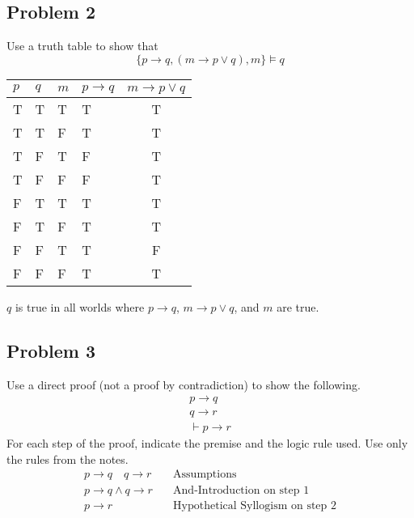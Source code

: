 \documentclass{math}
\begin{document}
\subsection*{Problem 2}
Use a truth table to show that
\[ \{p\to q,(m\to p\vee q),m\}\models q \]
\begin{center}
  \begin{tabular}{|p{0.6cm}|p{0.6cm}|p{0.6cm}|p{0.6cm}|c|}
    \hline
    \( p \) & \( q \) & \( m \) & \( p\to q \) & \( m\to p\vee q \) \\
    \hline
    \rowcolor{True}
    T & T & T & T & T \\
    T & T & F & T & T \\
    T & F & T & F & T \\
    T & F & F & F & T \\
    \rowcolor{True}
    F & T & T & T & T \\
    F & T & F & T & T \\
    F & F & T & T & F \\
    F & F & F & T & T \\
    \hline
  \end{tabular}
\end{center}
\( q \) is true in all worlds where \( p\to q \), \( m\to p\vee q \), and
\( m \) are true.

\subsection*{Problem 3}
Use a direct proof (not a proof by contradiction) to show the following.
\begin{gather*}
  p\to q \\
  q\to r \\
  \vdash p\to r
\end{gather*}
For each step of the proof, indicate the premise and the logic rule used.
Use only the rules from the notes.
\begin{align}
  p\to q \quad q\to r &\quad \text{Assumptions} \\
  p\to q\wedge q\to r &\quad \text{And-Introduction on step 1} \\
  p\to r &\quad \text{Hypothetical Syllogism on step 2}
\end{align}
\end{document}
